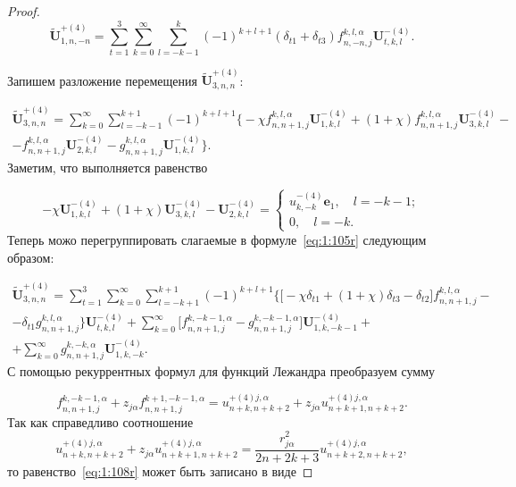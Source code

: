 \begin{russian}
\begin{proof}
\begin{equation}
\mathbf{\tilde U}_{1,n,-n}^{+(4)}=\sum\limits_{t=1}^3\sum\limits_{k=0}^\infty\sum\limits_{l=-k-1}^{k}(-1)^{k+l+1}(\delta_{t1}+\delta_{t3}){f}_{n,-n,j}^{k,l,\alpha}\mathbf{U}_{t,k,l}^{-(4)}.
\label{eq:1:104r}
\end{equation}

Запишем разложение перемещения $\mathbf{\tilde U}_{3,n,n}^{+(4)}$:

\begin{multline}\label{eq:1:105r}
\mathbf{\tilde U}_{3,n,n}^{+(4)}=\sum\limits_{k=0}^\infty\sum\limits_{l=-k-1}^{k+1}(-1)^{k+l+1}\bigg\{-\chi{f}_{n,n+1,j}^{k,l,\alpha}\mathbf{U}_{1,k,l}^{-(4)}+(1+\chi){f}_{n,n+1,j}^{k,l,\alpha}\mathbf{U}_{3,k,l}^{-(4)}- \\
-{f}_{n,n+1,j}^{k,l,\alpha}\mathbf{U}_{2,k,l}^{-(4)}-{g}_{n,n+1,j}^{k,l,\alpha}\mathbf{U}_{1,k,l}^{-(4)}\bigg\}.
\end{multline}
Заметим, что выполняется равенство

\begin{equation}
-\chi\mathbf{U}_{1,k,l}^{-(4)}+(1+\chi)\mathbf{U}_{3,k,l}^{-(4)}-
\mathbf{U}_{2,k,l}^{-(4)}=
\begin{cases}
u_{k,-k}^{-(4)}\mathbf{e}_1,\quad l=-k-1; \\
0,\quad l=-k.
\end{cases}
\label{eq:1:106r}
\end{equation}
Теперь можо перегруппировать слагаемые в формуле~\eqref{eq:1:105r} следующим образом:

\begin{multline}\label{eq:1:107r}
\mathbf{\tilde U}_{3,n,n}^{+(4)}=\sum\limits_{t=1}^3\sum\limits_{k=0}^\infty\sum\limits_{l=-k+1}^{k+1}(-1)^{k+l+1}\bigg\{\bigg\lbrack-\chi\delta_{t1}+(1+\chi)\delta_{t3}-
\delta_{t2}\bigg\rbrack{f}_{n,n+1,j}^{k,l,\alpha}- \\
-\delta_{t1}{g}_{n,n+1,j}^{k,l,\alpha}\bigg\}\mathbf{U}_{t,k,l}^{-(4)}+\sum\limits_{k=0}^\infty\bigg\lbrack
{f}_{n,n+1,j}^{k,-k-1,\alpha}-{g}_{n,n+1,j}^{k,-k-1,\alpha}\bigg\rbrack\mathbf{U}_{1,k,-k-1}^{-(4)}+ \\
+\sum\limits_{k=0}^\infty{g}_{n,n+1,j}^{k,-k,\alpha}\mathbf{U}_{1,k,-k}^{-(4)}.
\end{multline}
С помощью рекуррентных формул для функций Лежандра преобразуем сумму

\begin{equation}
{f}_{n,n+1,j}^{k,-k-1,\alpha}+z_{j\alpha}{f}_{n,n+1,j}^{k+1,-k-1,\alpha}={u}_{n+k,n+k+2}^{+(4)j,\alpha}+z_{j\alpha}{u}_{n+k+1,n+k+2}^{+(4)j,\alpha}.
\label{eq:1:108r}
\end{equation}
Так как справедливо соотношение
$$
{u}_{n+k,n+k+2}^{ + (4)j,\alpha}+z_{j\alpha}{u}_{n+k+1,n+k+2}^{+(4)j,\alpha}=\frac{r_{j\alpha}^2}{2n+2k+3}u_{n+k+2,n+k+2}^{+(4)j,\alpha},
$$
то равенство~\eqref{eq:1:108r} может быть записано в виде


\end{proof}
\end{russian}
